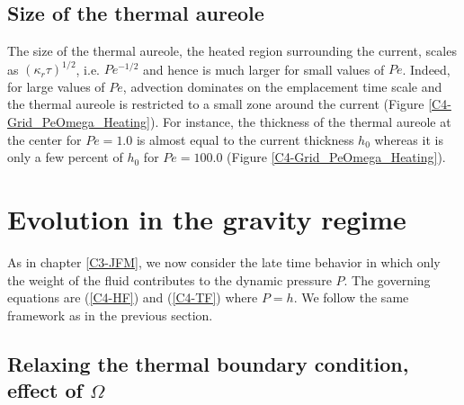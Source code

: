 \subsection{Size of the thermal aureole}
\label{C4-sec:char-therm-anom}

The size  of the  thermal aureole, the  heated region  surrounding the
current,  scales as  $(\kappa_r  \tau)^{1/2}$,  i.e.  $Pe^{-1/2}$  and
hence is  much larger  for small  values of  $Pe$.  Indeed,  for large
values of $Pe$, advection dominates  on the emplacement time scale and
the thermal aureole  is restricted to a small zone  around the current
(Figure \ref{C4-Grid_PeOmega_Heating}). For instance, the thickness of
the thermal aureole at the center  for $Pe=1.0$ is almost equal to the
current thickness $h_0$ whereas it is  only a few percent of $h_0$ for
$Pe=100.0$ (Figure \ref{C4-Grid_PeOmega_Heating}).

\section{Evolution in the gravity regime}
\label{C4-sec:evol-grav-regime}

As in chapter \ref{C3-JFM}, we now  consider the late time behavior in
which only the weight of the fluid contributes to the dynamic pressure
$P$. The governing equations are (\ref{C4-HF}) and (\ref{C4-TF}) where
$P=h$. We follow the same framework as in the previous section.

\subsection{Relaxing  the   thermal  boundary  condition,   effect  of
  $\Omega$}
\label{C4-sec:infl-therm-bound}

